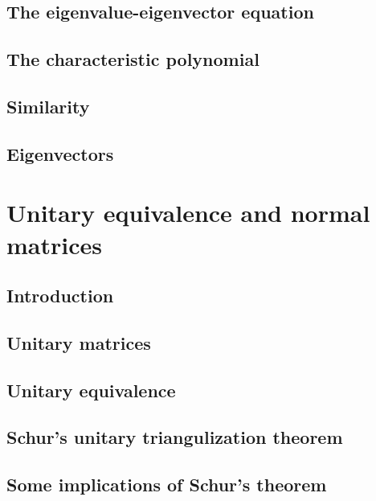 \documentclass[a4paper]{article}
\newcommand{\todobox}{\textcolor{red}{\fbox{\phantom{--}}}}
\begin{document}
\subsection{The eigenvalue-eigenvector equation}
\todobox
\subsection{The characteristic polynomial}
\todobox
\subsection{Similarity}
\todobox
\subsection{Eigenvectors}
\todobox

\newpage
\section{Unitary equivalence and normal matrices}
\setcounter{subsection}{-1}
\subsection{Introduction}
\todobox
\subsection{Unitary matrices}
\todobox
\subsection{Unitary equivalence}
\todobox
\subsection{Schur's unitary triangulization theorem}
\todobox
\subsection{Some implications of Schur's theorem}
\todobox
\end{document}

